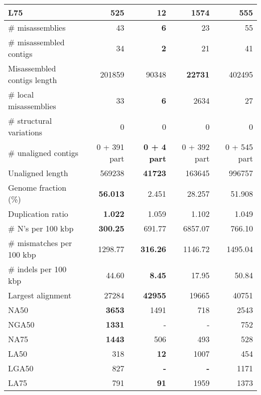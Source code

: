\documentclass[12pt,a4paper]{article}
\begin{document}
\begin{table}[ht]
\begin{center}
\begin{tabular}{|l*{4}{|r}|}
L75 & 525 & {\bf 12} & 1574 & 555 \\ \hline
\# misassemblies & 43 & {\bf 6} & 23 & 55 \\ \hline
\# misassembled contigs & 34 & {\bf 2} & 21 & 41 \\ \hline
Misassembled contigs length & 201859 & 90348 & {\bf 22731} & 402495 \\ \hline
\# local misassemblies & 33 & {\bf 6} & 2634 & 27 \\ \hline
\# structural variations & 0 & 0 & 0 & 0 \\ \hline
\# unaligned contigs & 0 + 391 part & {\bf 0 + 4 part} & 0 + 392 part & 0 + 545 part \\ \hline
Unaligned length & 569238 & {\bf 41723} & 163645 & 996757 \\ \hline
Genome fraction (\%) & {\bf 56.013} & 2.451 & 28.257 & 51.908 \\ \hline
Duplication ratio & {\bf 1.022} & 1.059 & 1.102 & 1.049 \\ \hline
\# N's per 100 kbp & {\bf 300.25} & 691.77 & 6857.07 & 766.10 \\ \hline
\# mismatches per 100 kbp & 1298.77 & {\bf 316.26} & 1146.72 & 1495.04 \\ \hline
\# indels per 100 kbp & 44.60 & {\bf 8.45} & 17.95 & 50.84 \\ \hline
Largest alignment & 27284 & {\bf 42955} & 19665 & 40751 \\ \hline
NA50 & {\bf 3653} & 1491 & 718 & 2543 \\ \hline
NGA50 & {\bf 1331} & - & - & 752 \\ \hline
NA75 & {\bf 1443} & 506 & 493 & 528 \\ \hline
LA50 & 318 & {\bf 12} & 1007 & 454 \\ \hline
LGA50 & 827 & {\bf -} & {\bf -} & 1171 \\ \hline
LA75 & 791 & {\bf 91} & 1959 & 1373 \\ \hline
\end{tabular}
\end{center}
\end{table}
\end{document}
